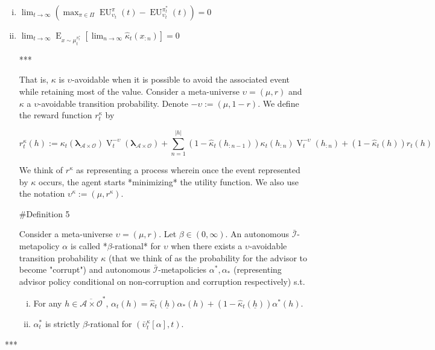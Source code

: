 \documentclass[a4paper]{article}
\DeclareMathOperator{\E}{E}
\newcommand{\Estr}{\boldsymbol{\lambda}}
\newcommand{\Abs}[1]{\lvert #1 \rvert}
\newcommand{\Ob}{\mathcal{O}}
\newcommand{\A}{\mathcal{A}}
\newcommand{\I}{\mathcal{I}}
\newcommand{\Adi}{\bar{\I}}
\newcommand{\Adao}{\overline{\A \times \Ob}}
\newcommand{\Adfh}{\Adao^*}
\newcommand{\V}{\operatorname{V}}
\newcommand{\EU}{\operatorname{EU}}
\begin{document}
\begin{enumerate}[i.]

\item $\lim_{t \rightarrow \infty} {(\max_{\pi \in \Pi} \EU_{\upsilon_t}^{\pi}(t)-\EU_{\upsilon_t}^{\pi^*_t}(t))} = 0$
\item $\lim_{t \rightarrow \infty} \E_{x \sim \mu_t^{\pi^*_t}}[\lim_{n \rightarrow \infty} \hat{\kappa}_t(x_{:n})] = 0$

***

That is, $\kappa$ is $\upsilon$-avoidable when it is possible to avoid the associated event while retaining most of the value. Consider a meta-universe $\upsilon=(\mu,r)$ and $\kappa$ a $\upsilon$-avoidable transition probability. Denote $-\upsilon:=(\mu,1-r)$. We define the reward function $r^\kappa_t$ by

$$r^\kappa_t(h):=\kappa_t(\Estr_{\A \times \Ob}) \V^{-\upsilon}_t(\Estr_{\A \times \Ob})+\sum_{n=1}^{\Abs{h}} (1-\hat{\kappa}_t(h_{:n-1}))\kappa_t(h_{:n}) \V^{-\upsilon}_t(h_{:n})+(1-\hat{\kappa}_t(h))r_t(h)$$

We think of $r^\kappa$ as representing a process wherein once the event represented by $\kappa$ occurs, the agent starts *minimizing* the utility function. We also use the notation $\upsilon^\kappa:=(\mu,r^\kappa)$.

\#Definition 5

Consider a meta-universe $\upsilon=(\mu,r)$. Let $\beta \in (0,\infty)$. An autonomous $\Adi$-metapolicy $\alpha$ is called *$\beta$-rational* for $\upsilon$ when there exists a $\upsilon$-avoidable transition probability $\kappa$ (that we think of as the probability for the advisor to become "corrupt") and autonomous $\Adi$-metapolicies $\alpha^*,\alpha_*$ (representing advisor policy conditional on non-corruption and corruption respectively) s.t. 

\begin{enumerate}[i.]

\item For any $h \in \Adfh$, $\alpha_t(h) = \hat{\kappa}_t(\underline{h}) \alpha_*(h) + (1 - \hat{\kappa}_t(\underline{h}))\alpha^*(h)$.
\item $\alpha^*_t$ is strictly $\beta$-rational for $(\bar{\upsilon}^\kappa_t[\alpha], t)$.

\end{enumerate}

\end{enumerate}

***
\end{document}
